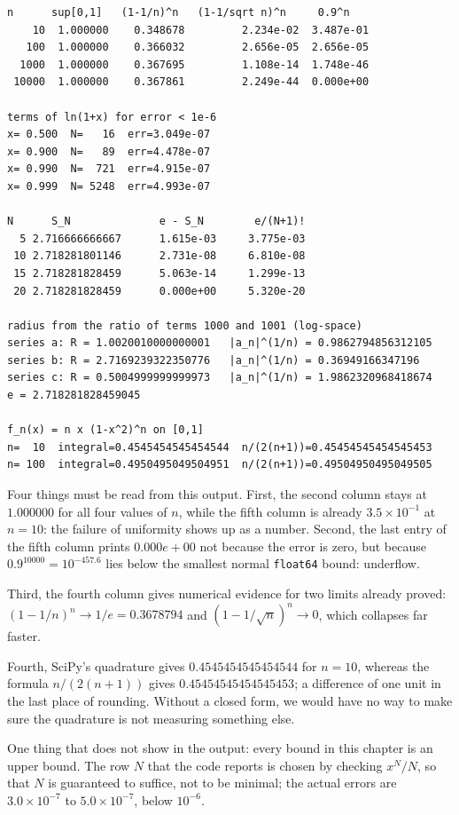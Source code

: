 \begin{verbatim}
n      sup[0,1]   (1-1/n)^n   (1-1/sqrt n)^n     0.9^n
    10  1.000000    0.348678         2.234e-02  3.487e-01
   100  1.000000    0.366032         2.656e-05  2.656e-05
  1000  1.000000    0.367695         1.108e-14  1.748e-46
 10000  1.000000    0.367861         2.249e-44  0.000e+00

terms of ln(1+x) for error < 1e-6
x= 0.500  N=   16  err=3.049e-07
x= 0.900  N=   89  err=4.478e-07
x= 0.990  N=  721  err=4.915e-07
x= 0.999  N= 5248  err=4.993e-07

N      S_N              e - S_N        e/(N+1)!
  5 2.716666666667      1.615e-03     3.775e-03
 10 2.718281801146      2.731e-08     6.810e-08
 15 2.718281828459      5.063e-14     1.299e-13
 20 2.718281828459      0.000e+00     5.320e-20

radius from the ratio of terms 1000 and 1001 (log-space)
series a: R = 1.0020010000000001   |a_n|^(1/n) = 0.9862794856312105
series b: R = 2.7169239322350776   |a_n|^(1/n) = 0.36949166347196
series c: R = 0.5004999999999973   |a_n|^(1/n) = 1.9862320968418674
e = 2.718281828459045

f_n(x) = n x (1-x^2)^n on [0,1]
n=  10  integral=0.4545454545454544  n/(2(n+1))=0.45454545454545453
n= 100  integral=0.4950495049504951  n/(2(n+1))=0.49504950495049505
\end{verbatim}

Four things must be read from this output. First, the second column stays at $1.000000$
for all four values of $n$, while the fifth column is already $3.5\times10^{-1}$ at
$n=10$: the failure of uniformity shows up as a number. Second, the last entry of the fifth
column prints $0.000e+00$ not because the error is zero, but because
$0.9^{10000}=10^{-457.6}$ lies below the smallest normal \texttt{float64} bound: underflow.

Third, the fourth column gives numerical evidence for two limits already
proved: $(1-1/n)^n\to1/e=0.3678794$ and $(1-1/\sqrt n)^n\to0$, which collapses
far faster.

Fourth, SciPy's quadrature gives $0.4545454545454544$ for $n=10$, whereas the
formula $n/(2(n+1))$ gives $0.45454545454545453$; a difference of one unit in the last place
of rounding. Without a closed form, we would have no way to make sure the quadrature is not
measuring something else.

One thing that does not show in the output: every bound in this chapter is an upper bound.
The row $N$ that the code reports is chosen by checking $x^N/N$, so that $N$ is
guaranteed to suffice, not to be minimal; the actual errors are $3.0\times10^{-7}$ to
$5.0\times10^{-7}$, below $10^{-6}$.

